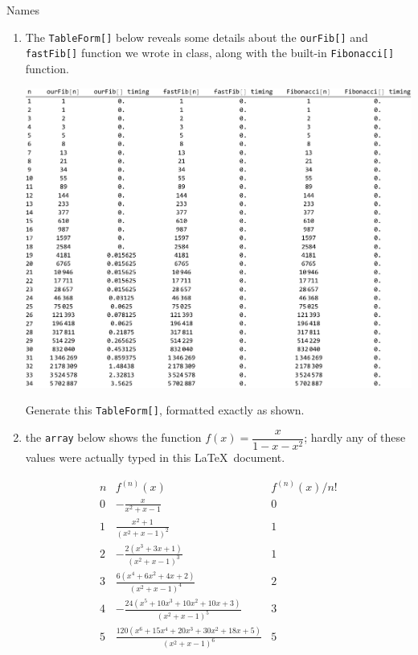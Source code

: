 \documentclass[12pt]{book}
\begin{document}
Names\underline{ \hspace{1in}} 
\begin{enumerate}
	\item The \verb|TableForm[]| below reveals some details about the \verb|ourFib[]| and \verb|fastFib[]| function we wrote in class, along with the built-in \verb|Fibonacci[]| function.
	\begin{center}
		\includegraphics[width=6in]{table.pdf}
	\end{center}
	Generate this \verb|TableForm[]|, formatted exactly as shown.
	\newpage
	\item the \verb|array| below shows the function $f(x)=\dfrac{x}{1-x-x^2}$; hardly any of these values were actually typed in this \LaTeX \ document.
	\renewcommand{\arraystretch}{2}
	\begin{center}
		$$
		\begin{array}{||c|c|c||}
			\hline
			n & f^{(n)}(x) & f^{(n)}(x)/n! \\
			\hline
			0 & -\frac{x}{x^2+x-1} & 0 \\
			1 & \frac{x^2+1}{\left(x^2+x-1\right)^2} & 1 \\
			2 & -\frac{2 \left(x^3+3
				x+1\right)}{\left(x^2+x-1\right)^3} & 1 \\
			3 & \frac{6 \left(x^4+6 x^2+4
				x+2\right)}{\left(x^2+x-1\right)^4} & 2 \\
			4 & -\frac{24 \left(x^5+10 x^3+10 x^2+10
				x+3\right)}{\left(x^2+x-1\right)^5} & 3 \\
			5 & \frac{120 \left(x^6+15 x^4+20 x^3+30 x^2+18
				x+5\right)}{\left(x^2+x-1\right)^6} & 5 \\

\end{array}$$
\end{center}
\end{enumerate}
\end{document}
